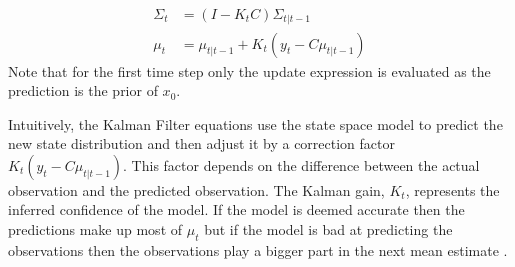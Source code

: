\begin{align}
\Sigma_t &= (I-K_tC)\Sigma_{t|t-1} 
\label{eq_filter_covar} \\
\mu_t &= \mu_{t|t-1} + K_t(y_t - C\mu_{t|t-1})
\label{eq_filter_mean}
\end{align}
Note that for the first time step only the update expression is evaluated as the prediction is the prior of $x_0$. 

Intuitively, the Kalman Filter equations use the state space model to predict the new state distribution and then adjust it by a correction factor $K_t(y_t - C\mu_{t|t-1})$. This factor depends on the difference between the actual observation and the predicted observation. The Kalman gain, $K_t$, represents the inferred confidence of the model. If the model is deemed accurate then the predictions make up most of $\mu_t$ but if the model is bad at predicting the observations then the observations play a bigger part in the next mean estimate \cite{bishop}. 

